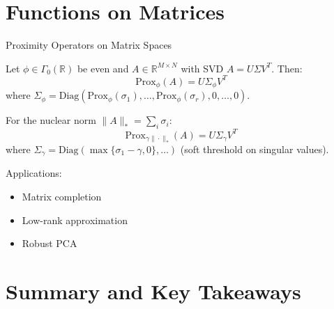 \documentclass[aspectratio=169,10pt]{beamer}
\begin{document}
\section{Functions on Matrices}

\begin{frame}{Proximity Operators on Matrix Spaces}
\begin{theorem}
Let $\phi \in \Gamma_0(\mathbb{R})$ be even and $A \in \mathbb{R}^{M \times N}$ with SVD $A = U\Sigma V^T$. Then:
\[
\mathrm{Prox}_\phi(A) = U\Sigma_\phi V^T
\]
where $\Sigma_\phi = \mathrm{Diag}(\mathrm{Prox}_\phi(\sigma_1), \ldots, \mathrm{Prox}_\phi(\sigma_r), 0, \ldots, 0)$.
\end{theorem}

\vspace{0.3cm}

\begin{example}
For the nuclear norm $\|A\|_* = \sum_i \sigma_i$:
\[
\mathrm{Prox}_{\gamma\|\cdot\|_*}(A) = U\Sigma_\gamma V^T
\]
where $\Sigma_\gamma = \mathrm{Diag}(\max\{\sigma_1 - \gamma, 0\}, \ldots)$ (soft threshold on singular values).
\end{example}

\vspace{0.3cm}

Applications:
\begin{itemize}
    \item Matrix completion
    \item Low-rank approximation
    \item Robust PCA
\end{itemize}
\end{frame}

\section{Summary and Key Takeaways}
\end{document}
